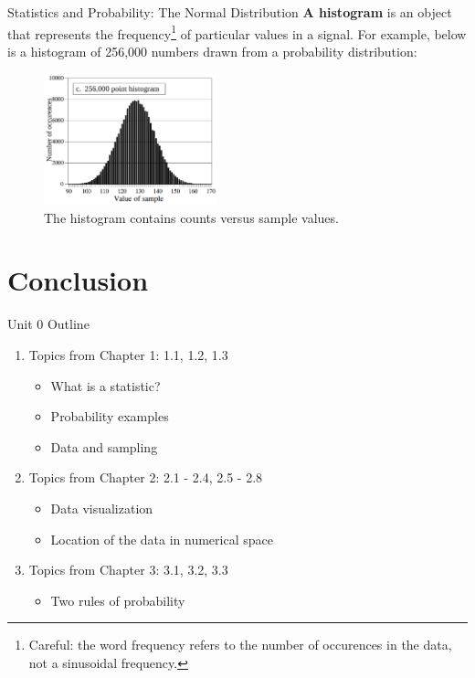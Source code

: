 \documentclass{beamer}
\begin{document}
\begin{frame}[fragile]{Statistics and Probability: The Normal Distribution}
\small
\textbf{A histogram} is an object that represents the frequency\footnote{Careful: the word frequency refers to the number of occurences in the data, not a sinusoidal frequency.} of particular values in a signal.  For example, below is a histogram of 256,000 numbers drawn from a probability distribution:
\begin{figure}
\centering
\includegraphics[width=0.45\textwidth]{figures/hist.png}
\caption{\label{fig:hist} The histogram contains counts versus sample values.}
\end{figure}
\end{frame}

\section{Conclusion}

\begin{frame}{Unit 0 Outline}
\begin{enumerate}
\item Topics from Chapter 1: 1.1, 1.2, 1.3
\begin{itemize}
\item What is a statistic?
\item Probability examples
\item Data and sampling
\end{itemize}
\item Topics from Chapter 2: 2.1 - 2.4, 2.5 - 2.8
\begin{itemize}
\item Data visualization
\item Location of the data in numerical space
\end{itemize}
\item Topics from Chapter 3: 3.1, 3.2, 3.3
\begin{itemize}
\item Two rules of probability
\end{itemize}
\end{enumerate}
\end{frame}
\end{document}
